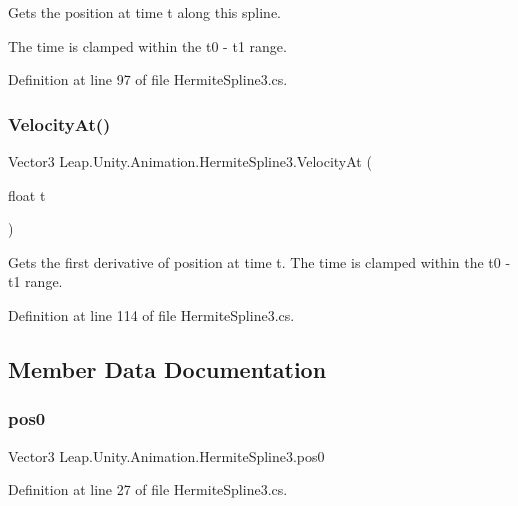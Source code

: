 Gets the position at time t along this spline. 

The time is clamped within the t0 -\/ t1 range. 

Definition at line 97 of file Hermite\+Spline3.\+cs.

\mbox{\label{struct_leap_1_1_unity_1_1_animation_1_1_hermite_spline3_a06396939556c99bada087c5f1b26a361}} 
\subsubsection{\texorpdfstring{VelocityAt()}{VelocityAt()}}
{\footnotesize\ttfamily Vector3 Leap.\+Unity.\+Animation.\+Hermite\+Spline3.\+Velocity\+At (\begin{DoxyParamCaption}\item[{float}]{t }\end{DoxyParamCaption})}



Gets the first derivative of position at time t. The time is clamped within the t0 -\/ t1 range. 



Definition at line 114 of file Hermite\+Spline3.\+cs.



\subsection{Member Data Documentation}
\mbox{\label{struct_leap_1_1_unity_1_1_animation_1_1_hermite_spline3_ab9901f2a45abfb1155ce0df806e6530a}} 
\subsubsection{\texorpdfstring{pos0}{pos0}}
{\footnotesize\ttfamily Vector3 Leap.\+Unity.\+Animation.\+Hermite\+Spline3.\+pos0}



Definition at line 27 of file Hermite\+Spline3.\+cs.

